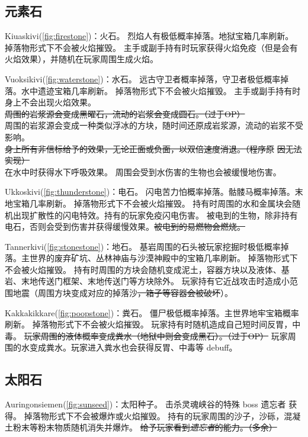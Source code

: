 \documentclass[11pt]{article}
\begin{document}
    \subsection{元素石}\label{subsec:element-stone}
    Kiuaskivi(\ref{fig:firestone})：火石。
    烈焰人有极低概率掉落。地狱宝箱几率刷新。
    掉落物形式下不会被火焰摧毁。
    主手或副手持有时玩家获得火焰免疫（但是会有火焰效果），并随机在玩家周围生成火焰。

    Vuoksikivi(\ref{fig:waterstone})：水石。
    远古守卫者概率掉落，守卫者极低概率掉落。水中遗迹宝箱几率刷新。
    掉落物形式下不会被火焰摧毁。
    主手或副手持有时身上不会出现火焰效果。\\
    \sout{周围的岩浆源会变成黑曜石，流动的岩浆会变成圆石。（过于OP）}\\
    周围的岩浆源会变成一种类似浮冰的方块，随时间还原成岩浆源，流动的岩浆不受影响。\\
    \sout{身上所有非信标给予的效果，无论正面或负面，以双倍速度消退。（程序原}
    \sout{因无法实现）}\\
    在水中时获得水下呼吸效果。
    周围会受到水伤害的生物也会被缓慢地伤害。

    Ukkoskivi(\ref{fig:thunderstone})：电石。
    闪电苦力怕概率掉落。骷髅马概率掉落。末地宝箱几率刷新。
    掉落物形式下不会被火焰摧毁。
    持有时周围的水和金属块会随机出现扩散性的闪电特效。持有的玩家免疫闪电伤害。
    被电到的生物，除非持有电石，否则会受到伤害并获得缓慢效果。\sout{被电到的易燃物会燃烧。}

    Tannerkivi(\ref{fig:stonestone})：地石。
    基岩周围的石头被玩家挖掘时极低概率掉落。主世界的废弃矿坑、丛林神庙与沙漠神殿中的宝箱几率刷新。
    掉落物形式下不会被火焰摧毁。
    持有时周围的方块会随机变成泥土，容器方块以及液体、基岩、末地传送门框架、末地传送门等方块除外。
    玩家持有它近战攻击时造成小范围地震（周围方块变成对应的掉落沙\sout{，箱子等容器会被破坏}）。

    Kakkakikkare(\ref{fig:poopstone})：粪石。
    僵尸极低概率掉落。主世界地牢宝箱概率刷新。
    掉落物形式下不会被火焰摧毁。
    玩家持有时随机造成自己短时间反胃，中毒。
    \sout{玩家周围的液体概率变成粪水（地狱中则会变成黑石）。（过于OP）}
    玩家周围的水变成粪水。玩家进入粪水也会获得反胃、中毒等 debuff。

    \subsection{太阳石}\label{subsec:solar-stone}
    Auringonsiemen(\ref{fig:sunseed})：太阳种子。
    击杀灵魂峡谷的特殊 boss 遗忘者 获得。
    掉落物形式下不会被爆炸或火焰摧毁。
    持有的玩家周围的沙子，沙砾，混凝土粉末等粉末物质随机消失并爆炸。
    \sout{给予玩家看到\textit{遗忘者}的能力。（多余）}
\end{document}
